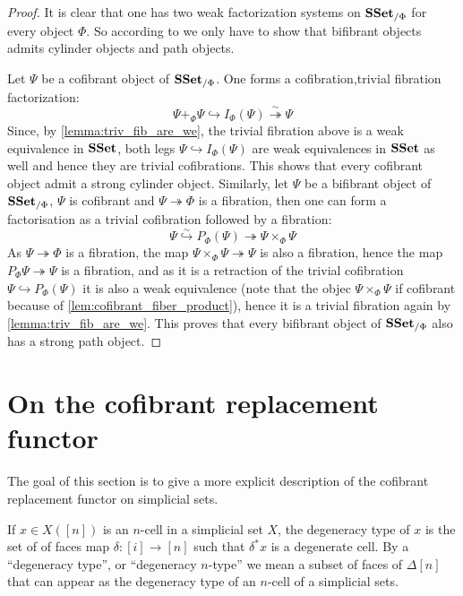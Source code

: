 \documentclass[reqno,10pt,a4paper,oneside,draft]{amsart}
\begin{document}
\begin{proof}

It is clear that one has two weak factorization systems on $\mathbf{SSet}_{/\Phi}$ for every object $\Phi$. So according to \cite[Definition~2.1.11]{henry2018wms} we only have to show that bifibrant objects admits cylinder objects and path objects.

Let $\Psi$ be a cofibrant object of $\mathbf{SSet}_{/\Phi}$. One forms a cofibration,trivial fibration factorization:
\[ 
\Psi +_\Phi \Psi \hookrightarrow I_\Phi(\Psi) \overset{\sim}{\twoheadrightarrow} \Psi 
\]
Since, by  \cref{lemma:triv_fib_are_we}, the trivial fibration above is a weak equivalence in $\mathbf{SSet}$, both legs $\Psi \hookrightarrow I_\Phi(\Psi)$ are weak equivalences in $\mathbf{SSet}$ as well and hence they are trivial cofibrations. This shows that every cofibrant object admit a strong cylinder object. Similarly, let $\Psi$ be a bifibrant object of $\mathbf{SSet}_{/\Phi}$, \ie $\Psi$ is cofibrant and $\Psi \twoheadrightarrow \Phi$ is a fibration, then one can form a factorisation as a trivial cofibration followed by a fibration:
\[ 
\Psi \overset{\sim}{\hookrightarrow} P_\Phi(\Psi) {\twoheadrightarrow} \Psi \times_{\Phi} \Psi 
\]
As $\Psi \twoheadrightarrow \Phi$ is a fibration, the map $\Psi \times_\Phi \Psi \twoheadrightarrow \Psi$ is also a fibration, hence the map $P_\Phi \Psi \twoheadrightarrow \Psi$ is a fibration, and as it is a retraction of the trivial cofibration $\Psi \hookrightarrow P_\Phi(\Psi)$ it is also a weak equivalence (note that the objec $\Psi \times_\Phi \Psi$ if cofibrant because of \cref{lem:cofibrant_fiber_product}), hence it is a trivial fibration again by \cref{lemma:triv_fib_are_we}. This proves that every bifibrant object of $\mathbf{SSet}_{/\Phi}$ also has a strong path object.
\end{proof}

\newpage

\section{On the cofibrant replacement functor}

The goal of this section is to give a more explicit description of the cofibrant replacement functor on simplicial sets.


\begin{definition}
If $x \in X([n])$ is an $n$-cell in a simplicial set $X$, the degeneracy type of $x$ is the set of of faces map $\delta:[i] \rightarrow [n]$ such that $\delta^* x$ is a degenerate cell. 
By a ``degeneracy type'', or ``degeneracy $n$-type'' we mean a subset of faces of $\Delta[n]$ that can appear as the degeneracy type of an $n$-cell of a simplicial sets.
\end{definition}
\end{document}
